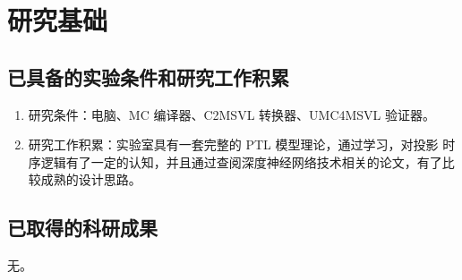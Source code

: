 \section{研究基础}
\subsection{已具备的实验条件和研究工作积累}
\begin{enumerate}
  \item 研究条件：电脑、MC 编译器、C2MSVL 转换器、UMC4MSVL 验证器。
  \item 研究工作积累：实验室具有一套完整的 PTL 模型理论，通过学习，对投影
时序逻辑有了一定的认知，并且通过查阅深度神经网络技术相关的论文，有了比较成熟的设计思路。
\end{enumerate}

\subsection{已取得的科研成果    }
无。
